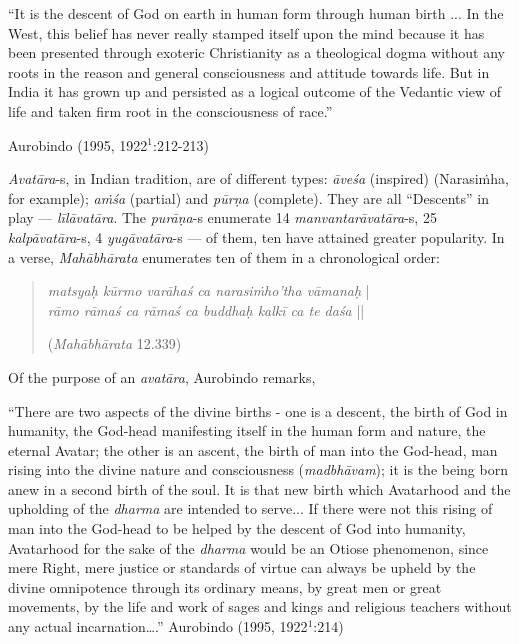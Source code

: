 \begin{myquote}
“It is the descent of God on earth in human form through human birth ... In the West, this belief has never really stamped itself upon the mind because it has been presented through exoteric Christianity as a theological dogma without any roots in the reason and general consciousness and attitude towards life. But in India it has grown up and persisted as a logical outcome of the Vedantic view of life and taken firm root in the consciousness of race.”	

\hfill Aurobindo (1995, 1922$^{1}$:212-213)
\end{myquote}

{\sl Avatāra}-s, in Indian tradition, are of different types: {\sl āveśa} (inspired) (Narasiṁha, for example); {\sl aṁśa} (partial) and {\sl pūrṇa} (complete). They are all “Descents” in play --- {\sl līlāvatāra}. The {\sl purāṇa}-s enumerate 14 {\sl manvantarāvatāra}-s, 25 {\sl kalpāvatāra}-s, 4 {\sl yugāvatāra}-s --- of them, ten have attained greater popularity. In a verse, {\sl Mahābhārata} enumerates ten of them in a chronological order: 
\begin{quote}
{{\sl matsyaḥ kūrmo varāhaś ca narasiṁho’tha vāmanaḥ}} |\\
{\sl rāmo rāmaś ca rāmaś ca buddhaḥ kalkī ca te daśa} || 

\hfill({\sl Mahābhārata} 12.339)
\end{quote}

\newpage

Of the purpose of an {\sl avatāra}, Aurobindo remarks, 

\begin{myquote}
“There are two aspects of the divine births - one is a descent, the birth of God in humanity, the God-head manifesting itself in the human form and nature, the eternal Avatar; the other is an ascent, the birth of man into the God-head, man rising into the divine nature and consciousness ({\sl madbhāvam}); it is the being born anew in a second birth of the soul. It is that new birth which Avatarhood and the upholding of the {\sl dharma} are intended to serve... If there were not this rising of man into the God-head to be helped by the descent of God into humanity, Avatarhood for the sake of the {\sl dharma} would be an Otiose phenomenon, since mere Right, mere justice or standards of virtue can always be upheld by the divine omnipotence through its ordinary means, by great men or great movements, by the life and work of sages and kings and religious teachers without any actual incarnation….”
\hfill Aurobindo (1995, 1922$^{1}$:214)
\end{myquote}

